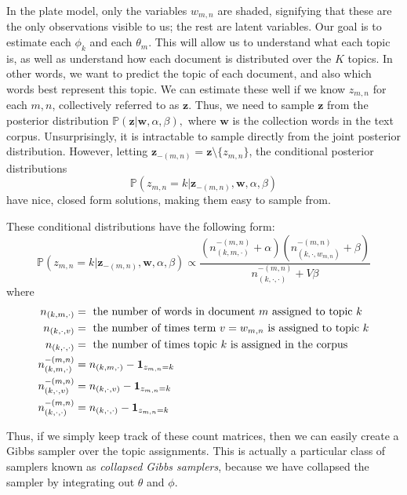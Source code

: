 In the plate model, only the variables $w_{m,n}$ are shaded, signifying that these are the only observations visible to us; the rest are latent variables. Our goal is to estimate each $\phi_{k}$ and each $\theta_{m}$. This will allow us to understand what each topic is, as well as understand how each document is distributed over the $K$ topics. In other words, we want to predict the topic of each document, and also which words best represent this topic.  We can estimate these well if we know $z_{m,n}$ for each $m, n$, collectively referred to as $\mathbf{z}$. Thus, we need to sample
$\mathbf{z}$ from the posterior distribution $\mathbb{P}(\mathbf{z} | \mathbf{w}, \alpha, \beta),$ where $\mathbf{w}$ is the collection words in the text corpus. Unsurprisingly, it is intractable to sample directly from the joint posterior distribution. However, letting $\mathbf{z}_{-(m,n)} = \mathbf{z}\setminus \{z_{m,n}\}$, the conditional posterior distributions
\[\mathbb{P}(z_{m,n} = k | \mathbf{z}_{-(m,n)}, \mathbf{w}, \alpha, \beta)\]
have nice, closed form solutions, making them easy to sample from.

These conditional distributions have the following form:
\begin{equation*}
\mathbb{P}(z_{m,n} = k | \mathbf{z}_{-(m,n)}, \mathbf{w}, \alpha, \beta) \propto \frac{(n_{(k,m,\cdot)}^{-(m,n)} + \alpha)(n_{(k, \cdot, w_{m,n})}^{-(m,n)} + \beta)}{n_{(k,\cdot,\cdot)}^{-(m,n)} + V \beta}
\end{equation*}
where
\begin{align*}
n_{(k,m,\cdot)} & = \mbox{ the number of words in document $m$ assigned to topic $k$} \\
n_{(k,\cdot,v)} & = \mbox{ the number of times term $v = w_{m,n}$ is assigned to topic $k$} \\
n_{(k,\cdot,\cdot)} & = \mbox{ the number of times topic $k$ is assigned in the corpus} \\
n_{(k,m,\cdot)}^{-(m,n)} & = n_{(k,m,\cdot)} - \boldsymbol{1}_{z_{m,n} = k} \\
n_{(k,\cdot,v)}^{-(m,n)} & = n_{(k,\cdot,v)} - \boldsymbol{1}_{z_{m,n} = k} \\
n_{(k,\cdot,\cdot)}^{-(m,n)} & = n_{(k,\cdot,\cdot)} - \boldsymbol{1}_{z_{m,n} = k}
\end{align*}

Thus, if we simply keep track of these count matrices, then we can easily create a Gibbs sampler over the topic assignments. This is actually a particular class of samplers known as \emph{collapsed Gibbs samplers}, because we have collapsed the sampler by integrating out $\theta$ and $\phi$.

